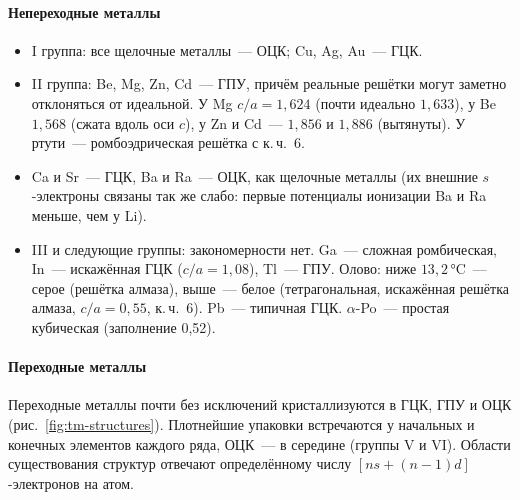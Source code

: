 \paragraph{Непереходные металлы}
\begin{itemize}
\item I группа: все щелочные металлы~— ОЦК; Cu, Ag, Au~— ГЦК.
\item II группа: Be, Mg, Zn, Cd~— ГПУ, причём реальные решётки могут
заметно отклоняться от идеальной. У Mg $c/a=1{,}624$ (почти идеально
$1{,}633$), у Be $1{,}568$ (сжата вдоль оси $c$), у Zn и Cd~— $1{,}856$ и
$1{,}886$ (вытянуты). У ртути~— ромбоэдрическая решётка с к.\,ч.~6.
\item Ca и Sr~— ГЦК, Ba и Ra~— ОЦК, как щелочные металлы (их внешние
$s$-электроны связаны так же слабо: первые потенциалы ионизации Ba и Ra
меньше, чем у Li).
\item III и следующие группы: закономерности нет. Ga~— сложная
ромбическая, In~— искажённая ГЦК ($c/a=1{,}08$), Tl~— ГПУ. Олово: ниже
$13{,}2$\,°C~— серое (решётка алмаза), выше~— белое (тетрагональная,
искажённая решётка алмаза, $c/a=0{,}55$, к.\,ч.~6). Pb~— типичная ГЦК.
$\alpha$-Po~— простая кубическая (заполнение 0,52).
\end{itemize}

\paragraph{Переходные металлы}
Переходные металлы почти без исключений кристаллизуются в ГЦК, ГПУ и ОЦК
(рис.~\ref{fig:tm-structures}). Плотнейшие упаковки встречаются у
начальных и конечных элементов каждого ряда, ОЦК~— в середине (группы V
и VI). Области существования структур отвечают определённому числу
$[ns+(n-1)d]$-электронов на атом.

